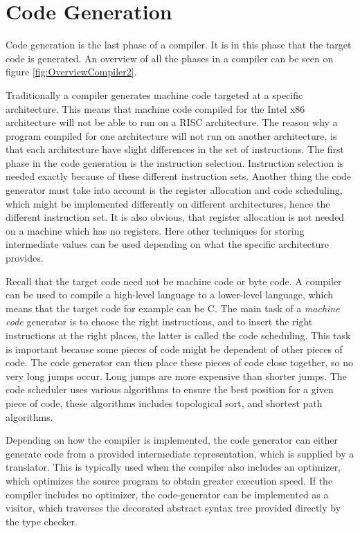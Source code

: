 \section{Code Generation}
Code generation is the last phase of a compiler. It is in this phase that the target code is generated. An overview of all the phases in a compiler can be seen on figure \ref{fig:OverviewCompiler2}.

Traditionally a compiler generates machine code targeted at a specific architecture. This means that machine code compiled for the Intel x86 architecture will not be able to run on a RISC architecture. The reason why a program compiled for one architecture will not run on another architecture, is that each architecture have slight differences in the set of instructions. The first phase in the code generation is the instruction selection. Instruction selection is needed exactly because of these different instruction sets. Another thing the code generator must take into account is the register allocation and code scheduling, which might be implemented differently on different architectures, hence the different instruction set. It is also obvious, that register allocation is not needed on a machine which has no registers. Here other techniques for storing intermediate values can be used depending on what the specific architecture provides.

Recall that the target code need not be machine code or byte code. A compiler can be used to compile a high-level language to a lower-level language, which means that the target code for example can be C. The main task of a \emph{machine code} generator is to choose the right instructions, and to insert the right instructions at the right places, the latter is called the code scheduling. This task is important because some pieces of code might be dependent of other pieces of code. The code generator can then place these pieces of code close together, so no very long jumps occur. Long jumps are more expensive than shorter jumps. The code scheduler uses various algorithms to ensure the best position for a given piece of code, these algorithms includes topological sort, and shortest path algorithms.

Depending on how the compiler is implemented, the code generator can either generate code from a provided intermediate representation, which is supplied by a translator. This is typically used when the compiler also includes an optimizer, which optimizes the source program to obtain greater execution speed. If the compiler includes no optimizer, the code-generator can be implemented as a visitor, which traverses the decorated abstract syntax tree provided directly by the type checker.